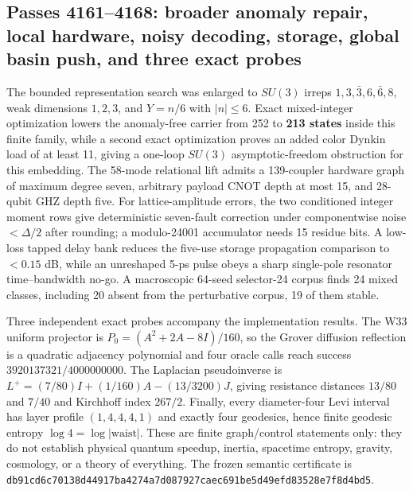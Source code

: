 \subsection{Passes 4161--4168: broader anomaly repair, local hardware, noisy decoding, storage, global basin push, and three exact probes}
\label{sec:bt4161-4168}
The bounded representation search was enlarged to $SU(3)$ irreps $1,3,\bar3,6,\bar6,8$, weak dimensions $1,2,3$, and $Y=n/6$ with $|n|\le6$.  Exact mixed-integer optimization lowers the anomaly-free carrier from 252 to \textbf{213 states} inside this finite family, while a second exact optimization proves an added color Dynkin load of at least 11, giving a one-loop $SU(3)$ asymptotic-freedom obstruction for this embedding.  The 58-mode relational lift admits a 139-coupler hardware graph of maximum degree seven, arbitrary payload CNOT depth at most 15, and 28-qubit GHZ depth five.  For lattice-amplitude errors, the two conditioned integer moment rows give deterministic seven-fault correction under componentwise noise $<\Delta/2$ after rounding; a modulo-24001 accumulator needs 15 residue bits.  A low-loss tapped delay bank reduces the five-use storage propagation comparison to $<0.15$ dB, while an unreshaped 5-ps pulse obeys a sharp single-pole resonator time--bandwidth no-go.  A macroscopic 64-seed selector-24 corpus finds 24 mixed classes, including 20 absent from the perturbative corpus, 19 of them stable.

Three independent exact probes accompany the implementation results.  The W33 uniform projector is $P_0=(A^2+2A-8I)/160$, so the Grover diffusion reflection is a quadratic adjacency polynomial and four oracle calls reach success $3920137321/4000000000$.  The Laplacian pseudoinverse is $L^+=(7/80)I+(1/160)A-(13/3200)J$, giving resistance distances $13/80$ and $7/40$ and Kirchhoff index $267/2$.  Finally, every diameter-four Levi interval has layer profile $(1,4,4,4,1)$ and exactly four geodesics, hence finite geodesic entropy $\log4=\log|\mathrm{waist}|$.  These are finite graph/control statements only: they do not establish physical quantum speedup, inertia, spacetime entropy, gravity, cosmology, or a theory of everything.  The frozen semantic certificate is \texttt{db91cd6c70138d44917ba4274a7d087927caec691be5d49efd83528e7f8d4bd5}.
